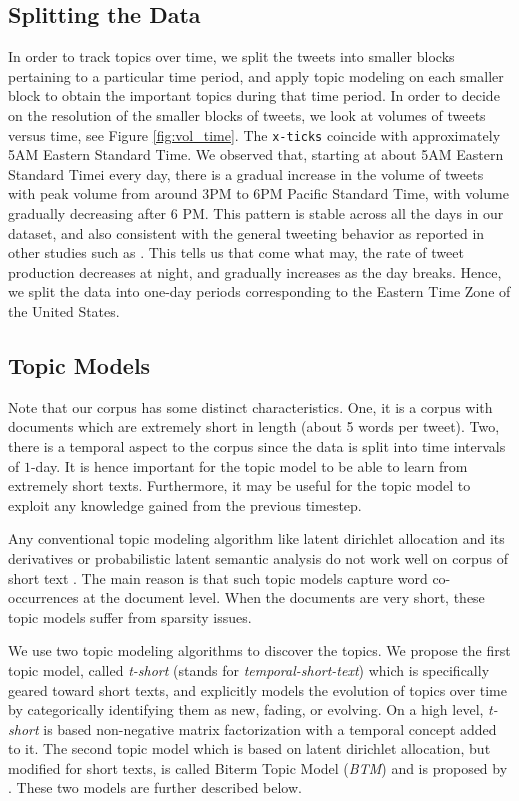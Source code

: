 \subsection{Splitting the Data}
\label{subsec:data_split}
In order to track topics over time,
we split the tweets into smaller blocks pertaining to a particular time period, and apply
topic modeling on each smaller block to obtain the important topics during that time period.
In order to decide on the resolution of the smaller blocks of tweets, we look at volumes
of tweets versus time, see Figure \ref{fig:vol_time}.
The \texttt{x-ticks} coincide with approximately 5AM Eastern Standard Time.
We observed that,
starting at about 5AM Eastern Standard Timei every day, there is a gradual increase in the volume of tweets
with peak volume from around 3PM to 6PM Pacific Standard Time, with volume gradually decreasing
after 6 PM.  This pattern is
stable across all the days in our dataset, and also consistent with the general tweeting behavior
as reported in other studies such as \cite{liu:2010, java:2007}.  This tells us that come what may,
the rate of tweet production decreases at night, and gradually increases as the day breaks.
Hence, we split the data into one-day periods corresponding to the Eastern Time Zone of the United States.


\subsection{Topic Models}
\label{subsec:topic_models}
Note that our corpus has some distinct characteristics.  One, it is a corpus with
documents which are extremely short in length (about 5 words per tweet).  Two, there is
a temporal aspect to the corpus since the data is split into time intervals of $1$-day.
It is hence important for the topic model to be able to learn from extremely short texts.
Furthermore, it may be useful for the topic model to exploit any knowledge gained from the previous timestep.  

Any conventional topic modeling algorithm like latent dirichlet allocation and its
derivatives \cite{blei2003}
or probabilistic latent semantic analysis \cite{deerwester1990indexing} do not work well on corpus
of short text \cite{Hong:2010, Jin:2011, Zhang:2013}.  The main reason is that such topic models capture word co-occurrences at the document
level.  When the documents are very short, these topic models suffer from sparsity issues.

We use two topic modeling algorithms to discover the topics.  We propose the first
topic model, called \emph{t-short} (stands for \emph{temporal-short-text}) which is specifically geared toward short texts,
and explicitly models the evolution of topics over time by categorically identifying
them as new, fading, or evolving.  On a high level, \emph{t-short} is based non-negative matrix factorization
with 
a temporal concept added to it.  The second topic model which is based on
latent dirichlet allocation, but modified for short texts, is called Biterm Topic
Model (\emph{BTM}) and is proposed by \cite{Yan:2013:BTM}. 
These two models are further described below.

